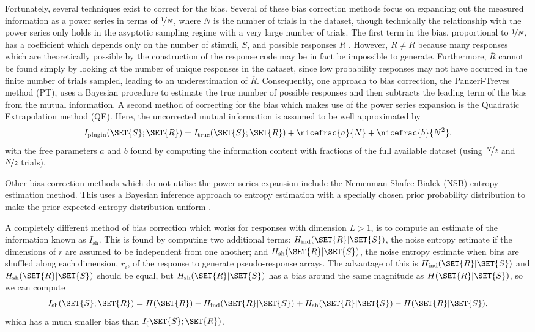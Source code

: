 Fortunately, several techniques exist to correct for the bias.
Several of these bias correction methods focus on expanding out the measured information as a power series \cite{Miller1955,Treves1995} in terms of $\nicefrac{1}{N}$, where $N$ is the number of trials in the dataset, though technically the relationship with the power series only holds in the asyptotic sampling regime with a very large number of trials. The first term in the bias, proportional to $\nicefrac{1}{N}$, has a coefficient which depends only on the number of stimuli, $S$, and possible responses $\overbar{R}$ . However, $\overbar{R} \neq R$ because many responses which are theoretically possible by the construction of the response code may be in fact be impossible to generate. Furthermore, $\overbar{R}$ cannot be found simply by looking at the number of unique responses in the dataset, since low probability responses may not have occurred in the finite number of trials sampled, leading to an underestimation of $\overbar{R}$.
Consequently, one approach to bias correction, the Panzeri-Treves method \cite{Panzeri1996} (PT), uses a Bayesian procedure to estimate the true number of possible responses and then subtracts the leading term of the bias from the mutual information.
A second method of correcting for the bias which makes use of the power series expansion is the Quadratic Extrapolation method \cite{Strong1998} (QE). Here, the uncorrected mutual information is assumed to be well approximated by
$$
I_{\text{plugin}}(\SET{S};\SET{R}) = I_{\text{true}}(\SET{S};\SET{R}) + \nicefrac{a}{N} + \nicefrac{b}{N^2}
,$$
with the free parameters $a$ and $b$ found by computing the information content with fractions of the full available dataset (\ie using $\nicefrac{N}{2}$ and $\nicefrac{N}{2}$ trials).

Other bias correction methods which do not utilise the power series expansion include the Nemenman-Shafee-Bialek (NSB) entropy estimation method.
This uses a Bayesian inference approach to entropy estimation with a specially chosen prior probability distribution to make the prior expected entropy distribution uniform \cite{Nemenman2004}.

A completely different method of bias correction which works for responses with dimension $L > 1$, is to compute an estimate of the information known as $I_{\text{sh}}$.
This is found \cite{Montemurro2007} by computing two additional terms: $H_\text{ind}( \SET{R} | \SET{S} )$, the noise entropy estimate if the dimensions of $r$ are assumed to be independent from one another; and $H_\text{sh}( \SET{R} | \SET{S} )$, the noise entropy estimate when bins are shuffled along each dimension, $r_i$, of the response to generate pseudo-response arrays. The advantage of this is $H_\text{ind}( \SET{R} | \SET{S} )$ and $H_\text{sh}( \SET{R} | \SET{S} )$ should be equal, but $H_\text{sh}( \SET{R} | \SET{S} )$ has a bias around the same magnitude as $H( \SET{R} | \SET{S} )$, so we can compute
$$
I_{\text{sh}}(\SET{S};\SET{R}) = H( \SET{R} ) - H_\text{ind}( \SET{R} | \SET{S} ) + H_\text{sh}( \SET{R} | \SET{S} ) - H( \SET{R} | \SET{S} )
,$$
which has a much smaller bias than $I_(\SET{S};\SET{R})$.

